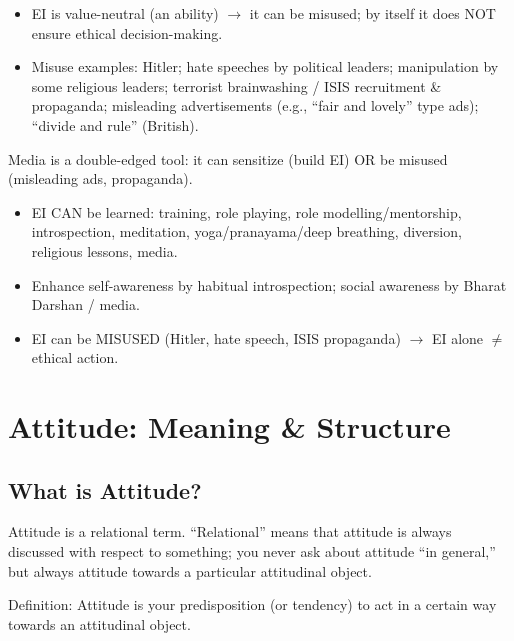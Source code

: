 \begin{CriticalPoint}
\begin{itemize}
\item EI is value-neutral (an ability) $\rightarrow$ it can be misused; by itself it does NOT ensure ethical decision-making.
\item Misuse examples: Hitler; hate speeches by political leaders; manipulation by some religious leaders; terrorist brainwashing / ISIS recruitment \& propaganda; misleading advertisements (e.g., ``fair and lovely'' type ads); ``divide and rule'' (British).
\end{itemize}
\end{CriticalPoint}

\begin{ExampleBox}
Media is a double-edged tool: it can sensitize (build EI) OR be misused (misleading ads, propaganda).
\end{ExampleBox}

\begin{QuickRevision}
\begin{itemize}
\item EI CAN be learned: training, role playing, role modelling/mentorship, introspection, meditation, yoga/pranayama/deep breathing, diversion, religious lessons, media.
\item Enhance self-awareness by habitual introspection; social awareness by Bharat Darshan / media.
\item EI can be MISUSED (Hitler, hate speech, ISIS propaganda) $\rightarrow$ EI alone $\neq$ ethical action.
\end{itemize}
\end{QuickRevision}

\section{Attitude: Meaning \& Structure}

\subsection{What is Attitude?}

Attitude is a relational term. ``Relational'' means that attitude is always discussed with respect to something; you never ask about attitude ``in general,'' but always attitude towards a particular attitudinal object.

Definition: Attitude is your predisposition (or tendency) to act in a certain way towards an attitudinal object.

